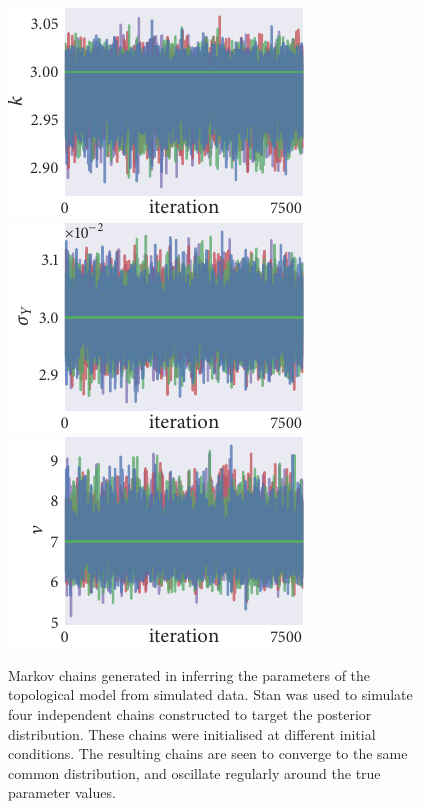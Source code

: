 \begin{figure}[tbp]
  \includegraphics{top_trace_k.pdf}%
  \includegraphics{top_trace_sigma_Y.pdf}%
  \includegraphics{top_trace_nu.pdf}
  \caption{Markov chains generated in inferring the parameters of the
    topological model from simulated data. Stan was used to simulate four
    independent chains constructed to target the posterior distribution.
    These chains were initialised at different initial conditions. The
    resulting chains are seen to converge to the same common distribution, and
    oscillate regularly around the true parameter values.}
  \label{fig:top_trace}
\end{figure}
